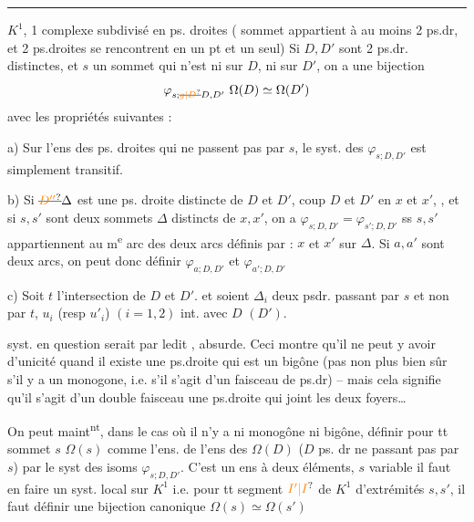\begin{center}\rule{1cm}{.3pt}\end{center}

$K^1$, 1 complexe subdivisé en ps. droites ( sommet
appartient à au moins 2 ps.dr, et 2 ps.droites se rencontrent en un pt et un seul)
Si $D,D'$ sont 2 ps.dr. distinctes, et $s$ un sommet
qui n'est ni sur $D$, ni sur $D'$, on a une bijection
\[
\varphi_{s;\deleted{\unsure{g|D}}D,D'}\ \Omega(D)\simeq\Omega(D')
\]
avec les propriétés suivantes :

a) Sur l'ens des ps. droites  qui ne passent pas
par $s$,  le syst. des $\varphi_{s;D,D'}$ est simplement transitif.

b) Si $\deleted{\unsure{D''}}\Delta$ est une ps. droite distincte de $D$ et $D'$,
coup $D$ et $D'$ en $x$ et $x'$, , et si $s,s'$ sont deux
sommets  $\Delta$ distincts de $x,x'$,  
 on a $\varphi_{s;D,D'}=\varphi_{s';D,D'}$ ss $s,s'$
appartiennent au m\textsuperscript{e} arc des deux arcs définis par :
$x$ et $x'$ sur $\Delta$. Si $a,a'$ sont  deux arcs,
on peut donc définir $\varphi_{a;D,D'}$ et $\varphi_{a';D,D'}$

c) Soit $t$  l'intersection de $D$ et $D'$.
et soient $\Delta_i$   deux psdr. passant par $s$ et non par
$t$,  $u_i$ (resp $u'_i$) $(i=1,2)$  int. avec $D$ $(D')$.

syst.  en question serait  par ledit ,
absurde. Ceci montre qu'il ne peut y avoir d'unicité quand il existe une ps.droite qui est
un bigône (pas non plus bien sûr s'il y a
un monogone, i.e. s'il s'agit d'un faisceau
de ps.dr) -- mais cela signifie  qu'il
s'agit d'un double faisceau  une ps.droite qui joint les deux foyers\ldots

On peut maint\textsuperscript{nt}, dans le cas où il n'y a
ni monogône ni bigône, définir pour tt sommet $s$ $\Omega(s)$ comme l'ens.  de l'ens
des $\Omega(D)$ ($D$ ps. dr ne passant pas par $s$)
par le syst des isoms $\varphi_{s;D,D'}$. C'est un ens
à deux éléments,  $s$ variable il faut en
faire un syst. local sur $K^1$ i.e. pour
tt segment $\unsure{I'|I}$ de $K^1$ d'extrémités $s,s'$, il faut
définir une bijection canonique $\Omega(s)\simeq\Omega(s')$

